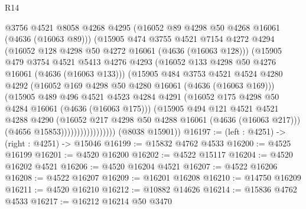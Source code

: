 \begin{lexlean}{R14}
\begin{coremodule}
                            @3756
                            @4521
                            @8058
                            @4268
                            @4295
                            (@16052 @89 @4298 @50 @4268 @16061 (@4636 (@16063 @89)))
                            (@15905
                              @474
                              @3755
                              @4521
                              @7154
                              @4272
                              @4294
                              (@16052 @128 @4298 @50 @4272 @16061 (@4636 (@16063 @128)))
                              (@15905
                                @479
                                @3754
                                @4521
                                @5413
                                @4276
                                @4293
                                (@16052 @133 @4298 @50 @4276 @16061 (@4636 (@16063 @133)))
                                (@15905
                                  @484
                                  @3753
                                  @4521
                                  @4524
                                  @4280
                                  @4292
                                  (@16052 @169 @4298 @50 @4280 @16061 (@4636 (@16063 @169)))
                                  (@15905
                                    @489
                                    @496
                                    @4521
                                    @4523
                                    @4284
                                    @4291
                                    (@16052 @175 @4298 @50 @4284 @16061 (@4636 (@16063 @175)))
                                    (@15905
                                      @494
                                      @121
                                      @4521
                                      @4521
                                      @4288
                                      @4290
                                      (@16052 @217 @4298 @50 @4288 @16061 (@4636 (@16063 @217)))
                                      (@4656 @15853)))))))))))))))))
      (@8038 @15901))
@16197 := (left : @4251) -> (right : @4251) -> @15046
@16199 := @15832 @4762 @4533
@16200 := @4525 @16199
@16201 := @4520 @16200
@16202 := @4522 @15117
@16204 := @4520 @16202 @4521
@16206 := @4520 @16204 @4521
@16207 := @4522 @16206
@16208 := @4522 @16207
@16209 := @16201 @16208
@16210 := @14750 @16209
@16211 := @4520 @16210
@16212 := @10882 @14626
@16214 := @15836 @4762 @4533
@16217 := @16212 @16214 @50 @3470

\end{coremodule}
\end{lexlean}
